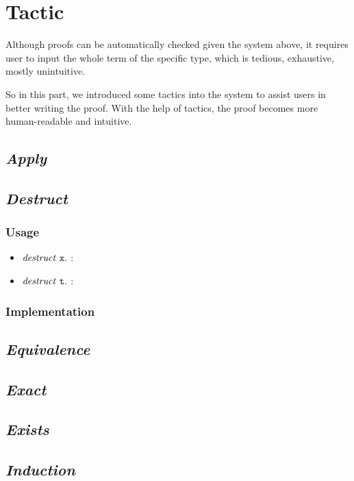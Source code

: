 \section{Tactic}
Although proofs can be automatically checked given the system above, it requires user to input the whole
term of the specific type, which is tedious, exhaustive, mostly unintuitive.\par
So in this part, we introduced some tactics into the system 
to assist users in better writing the proof. With the help of
tactics, the proof becomes more human-readable and intuitive.\par

\subsection{\it Apply}

\subsection{\it Destruct}

\subsubsection*{Usage}
\begin{itemize}
\item ${\it destruct}\ \tt x.$ : 
\item ${\it destruct}\ \tt t.$ :
\end{itemize}

\subsubsection*{Implementation}

\subsection{\it Equivalence}

\subsection{\it Exact}

\subsection{\it Exists}

\subsection{\it Induction}

